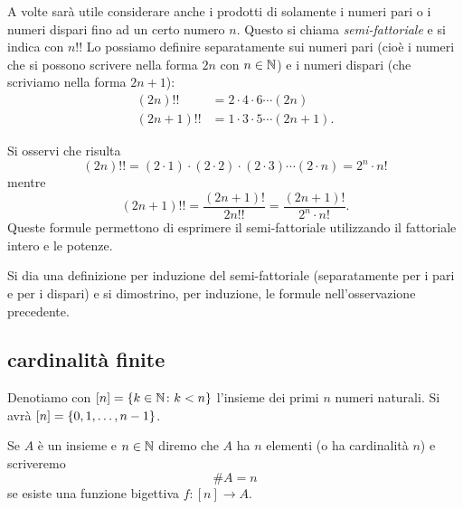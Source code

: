   A volte sarà utile considerare anche i prodotti di solamente i numeri
  pari o i numeri dispari fino ad un certo numero $n$. Questo
  si chiama \emph{semi-fattoriale}%
%
 e si indica con $n!!$
  Lo possiamo definire separatamente sui numeri pari (cioè 
  i numeri che si possono scrivere nella forma $2n$ con $n\in {\mathbb N}$)
  e i numeri dispari (che scriviamo nella forma $2n+1$):
  \begin{align*}
    (2n)!! &= 2 \cdot 4 \cdot 6 \cdots (2n) \\
    (2n+1)!! &= 1 \cdot 3 \cdot 5 \cdots (2n+1).
  \end{align*}
  
  \begin{remark}
  \label{rem:doppio_fattoriale}%
  Si osservi che risulta
  \[
    (2n)!! = (2\cdot 1) \cdot (2\cdot 2) \cdot (2\cdot 3) \cdots (2\cdot n)
          = 2^n \cdot n!
  \]
  mentre
  \[
    (2n+1)!! = \frac{(2n+1)!}{2n!!} = \frac{(2n+1)!}{2^n\cdot n!}.
  \]
  Queste formule permettono di esprimere il semi-fattoriale utilizzando
  il fattoriale intero e le potenze.
  \end{remark}
  
\begin{exercise}
  Si dia una definizione per induzione del semi-fattoriale
  (separatamente per i pari e per i dispari)
  e si dimostrino, per induzione, le formule nell'osservazione precedente.
\end{exercise}

\subsection{cardinalità finite}

Denotiamo con $[n] = {\left\{ k\in {\mathbb N}\colon k<n \right\}}$
l'insieme dei primi $n$ numeri naturali.
Si avrà $[n]={\left\{ 0,1,\dots, n-1 \right\}}$.

\begin{definition}
Se $A$ è un insieme e $n\in {\mathbb N}$ diremo che 
$A$ ha $n$ elementi (o ha cardinalità $n$) e scriveremo 
%
\[
  \#A = n
\]
se esiste una funzione bigettiva $f\colon [n]\to A$.
\end{definition}


